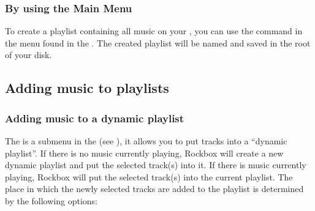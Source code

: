 \subsubsection{By using the Main Menu}
To create a playlist containing all music on your \dap{}, you can use the
 command in the  menu found
in the . The created playlist will be named
 and saved in the root of your \daps{} disk.

\subsection{Adding music to playlists}
  
\subsubsection{\label{ref:playlist_submenu}Adding music to a dynamic playlist}
The  is a submenu in the  (see
), it allows you to put tracks into a
``dynamic playlist''. If there is no music currently playing, Rockbox will
create a new dynamic playlist and put the selected track(s) into it.
If there is music currently playing, Rockbox will put the
selected track(s) into the current playlist. The place in which the newly
selected tracks are added to the playlist is determined by the following
options:

